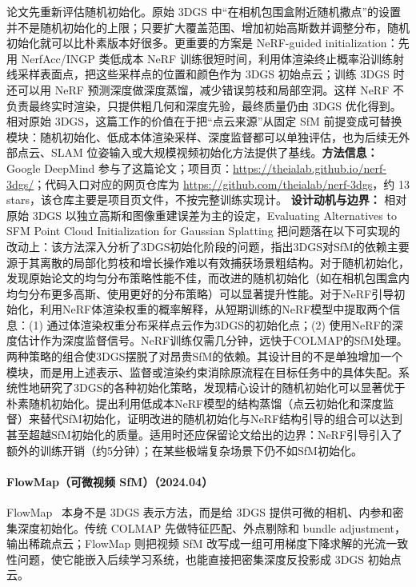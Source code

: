论文先重新评估随机初始化。原始 3DGS 中“在相机包围盒附近随机撒点”的设置并不是随机初始化的上限；只要扩大覆盖范围、增加初始高斯数并调整分布，随机初始化就可以比朴素版本好很多。更重要的方案是 NeRF-guided initialization：先用 NerfAcc/INGP 类低成本 NeRF 训练很短时间，利用体渲染终止概率沿训练射线采样表面点，把这些采样点的位置和颜色作为 3DGS 初始点云；训练 3DGS 时还可以用 NeRF 预测深度做深度蒸馏，减少错误剪枝和局部空洞。这样 NeRF 不负责最终实时渲染，只提供粗几何和深度先验，最终质量仍由 3DGS 优化得到。相对原始 3DGS，这篇工作的价值在于把“点云来源”从固定 SfM 前提变成可替换模块：随机初始化、低成本体渲染采样、深度监督都可以单独评估，也为后续无外部点云、SLAM 位姿输入或大规模视频初始化方法提供了基线。\textbf{方法信息：} Google DeepMind 参与了这篇论文；项目页：\url{https://theialab.github.io/nerf-3dgs/}；代码入口对应的网页仓库为 \url{https://github.com/theialab/nerf-3dgs}，约 13 stars，该仓库主要是项目页文件，不按完整训练实现计。
\textbf{设计动机与边界：} 相对原始 3DGS 以独立高斯和图像重建误差为主的设定，Evaluating Alternatives to SFM Point Cloud Initialization for Gaussian Splatting 把问题落在以下可实现的改动上：该方法深入分析了3DGS初始化阶段的问题，指出3DGS对SfM的依赖主要源于其离散的局部化剪枝和增长操作难以有效捕获场景粗结构。对于随机初始化，发现原始论文的均匀分布策略性能不佳，而改进的随机初始化（如在相机包围盒内均匀分布更多高斯、使用更好的分布策略）可以显著提升性能。对于NeRF引导初始化，利用NeRF体渲染权重的概率解释，从短期训练的NeRF模型中提取两个信息：(1) 通过体渲染权重分布采样点云作为3DGS的初始化点；(2) 使用NeRF的深度估计作为深度监督信号。NeRF训练仅需几分钟，远快于COLMAP的SfM处理。两种策略的组合使3DGS摆脱了对昂贵SfM的依赖。其设计目的不是单独增加一个模块，而是用上述表示、监督或渲染约束消除原流程在目标任务中的具体失配。系统性地研究了3DGS的各种初始化策略，发现精心设计的随机初始化可以显著优于朴素随机初始化。提出利用低成本NeRF模型的结构蒸馏（点云初始化和深度监督）来替代SfM初始化，证明改进的随机初始化与NeRF结构引导的组合可以达到甚至超越SfM初始化的质量。适用时还应保留论文给出的边界：NeRF引导引入了额外的训练开销（约5分钟）；在某些极端复杂场景下仍不如SfM初始化。
\paragraph{FlowMap（可微视频 SfM）（2024.04）}
FlowMap~\cite{2404_15259} 本身不是 3DGS 表示方法，而是给 3DGS 提供可微的相机、内参和密集深度初始化。传统 COLMAP 先做特征匹配、外点剔除和 bundle adjustment，输出稀疏点云；FlowMap 则把视频 SfM 改写成一组可用梯度下降求解的光流一致性问题，使它能嵌入后续学习系统，也能直接把密集深度反投影成 3DGS 初始点云。

